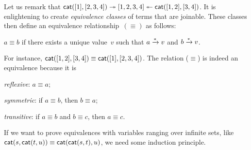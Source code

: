Let us remark that \(\textsf{cat}([1], [2,3,4]) \twoheadrightarrow
[1,2,3,4] \twoheadleftarrow \textsf{cat}([1,2],
[3,4])\). It is enlightening to create
\emph{equivalence classes} of terms that are joinable. These classes
then define an equivalence relationship~\((\equiv)\)
 as follows:
\begin{center}
  \(a \equiv b\) if there exists a unique value~\(v\) such that \(a
  \xrightarrow{\smash[t]{*}} v\) and \(b \xrightarrow{\smash{*}} v\).
\end{center}
For instance, \(\textsf{cat}([1,2], [3,4]) \equiv \textsf{cat}([1],
[2,3,4])\). The relation (\(\equiv\)) is indeed an equivalence
because it is
\begin{itemize*}

  \item \emph{reflexive}: \(a \equiv a\);

  \item \emph{symmetric}: if \(a \equiv b\), then \(b \equiv a\);

  \item \emph{transitive}: if \(a \equiv b\) and \(b \equiv c\), then
    \(a \equiv c\).

\end{itemize*}

If we want to prove equivalences with variables ranging over
infinite sets, like \(\textsf{cat}(s,\textsf{cat}(t,u)) \equiv
\textsf{cat}(\textsf{cat}(s,t),u)\), we need some
induction principle.


\label{par:well-founded}

